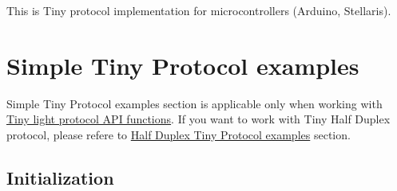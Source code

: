 This is Tiny protocol implementation for microcontrollers (Arduino, Stellaris).\hypertarget{arduino_arduino_tiny}{}\section{Simple Tiny Protocol examples}\label{arduino_arduino_tiny}
Simple Tiny Protocol examples section is applicable only when working with \hyperlink{group__LIGHT__API}{Tiny light protocol A\+PI functions}. If you want to work with Tiny Half Duplex protocol, please refere to \hyperlink{arduino_arduino_tiny_hd}{Half Duplex Tiny Protocol examples} section.\hypertarget{arduino_arduino_tiny_init}{}\subsection{Initialization}\label{arduino_arduino_tiny_init}

